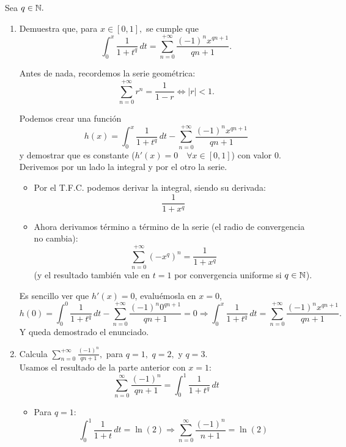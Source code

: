 \documentclass[12pt]{article}
\begin{document}
	\begin{ejercicio}[2 puntos]
		Sea $q \in \mathbb{N}.$
		\begin{enumerate}[label=\alph*)]
			\item Demuestra que, para $x \in [0, 1],$ se cumple que 
			$$ \int_{0}^{x} \frac{1}{1 + t^q} \, dt = \sum_{n=0}^{+\infty} \frac{(-1)^n x^{qn+1}}{qn+1}.$$
			
			Antes de nada, recordemos la serie geométrica: \\
			$$ \sum_{n=0}^{+\infty}r ^n = \frac{1}{1-r} \Leftrightarrow |r|<1.$$
			
			Podemos crear una función 
			$$ h(x)= \int_{0}^{x} \frac{1}{1 + t^q} \, dt - \sum_{n=0}^{+\infty} \frac{(-1)^n x^{qn+1}}{qn+1}$$
			y demostrar que es constante ($h'(x)=0 \quad \forall x \in [0, 1]$) con valor 0. Derivemos por un lado la integral y por el otro la serie.
			
			\begin{itemize}
				\item Por el T.F.C. podemos derivar la integral, siendo su derivada:
				$$ \frac{1}{1 + x^q}$$
				\item Ahora derivamos término a término de la serie (el radio de convergencia no cambia):
				$$\sum_{n=0}^{+\infty} (-x^q)^n = \frac{1}{1+x^q}$$
				(y el resultado también vale en $t=1$ por convergencia uniforme si $q \in \mathbb{N}$).
			\end{itemize}
			
			Es sencillo ver que $h'(x)=0$, evaluémosla en $x=0$,
			\begin{equation*}
				h(0)= \int_{0}^{0} \frac{1}{1 + t^q} \, dt - \sum_{n=0}^{+\infty} \frac{(-1)^n 0^{qn+1}}{qn+1} = 0
				\Longrightarrow \int_{0}^{x} \frac{1}{1 + t^q} \, dt = \sum_{n=0}^{+\infty} \frac{(-1)^n x^{qn+1}}{qn+1}.
			\end{equation*}
			Y queda demostrado el enunciado.
			
			\item  Calcula $\displaystyle \sum_{n=0}^{+\infty} \frac{(-1)^n}{qn+1},$ para $q=1,$ $q=2,$ y $q=3.$\\
			Usamos el resultado de la parte anterior con $x=1$:
			$$ \sum_{n=0}^{\infty} \frac{(-1)^n}{qn + 1} = \int_0^1 \frac{1}{1 + t^q} \, dt$$
				
			\begin{itemize}
				\item Para $q = 1$:
				$$ \int_0^1 \frac{1}{1 + t} \, dt = \ln(2)
				\Rightarrow \sum_{n=0}^{\infty} \frac{(-1)^n}{n + 1} = \ln(2)$$
					

\end{itemize}
\end{enumerate}
\end{ejercicio}
\end{document}
